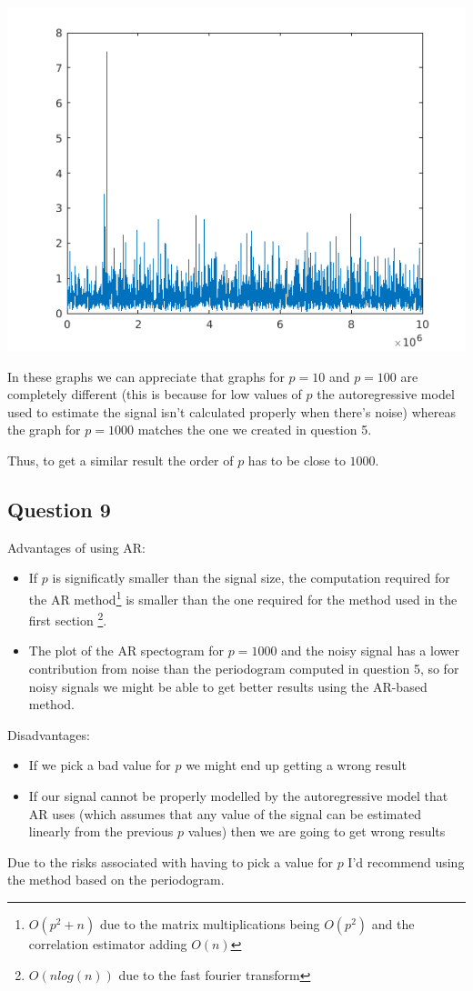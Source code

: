\documentclass[conference,9pt]{IEEEtran}
\begin{document}
\includegraphics[scale=0.6]{pn1000}

In these graphs we can appreciate that graphs for $p=10$ and $p=100$ are completely different (this is because for low values of $p$ the autoregressive model used to estimate the signal isn't calculated properly when there's noise) whereas the graph for $p=1000$ matches the one we created in question 5.

Thus, to get a similar result the order of $p$ has to be close to $1000$.

\subsection{Question 9}

Advantages of using AR:
\begin{itemize}
  \item If $p$ is significatly smaller than the signal size, the computation required for the AR method\footnote{$O(p^2+n)$ due to the matrix multiplications being $O(p^2)$ and the correlation estimator adding $O(n)$} is smaller than the one required for the method used in the first section \footnote{$O(nlog(n))$ due to the fast fourier transform}.
  \item The plot of the AR spectogram for $p=1000$ and the noisy signal has a lower contribution from noise than the periodogram computed in question 5, so for noisy signals we might be able to get better results using the AR-based method.
\end{itemize}

Disadvantages:
\begin{itemize}
  \item If we pick a bad value for $p$ we might end up getting a wrong result
  \item If our signal cannot be properly modelled by the autoregressive model that AR uses (which assumes that any value of the signal can be estimated linearly from the previous $p$ values) then we are going to get wrong results
\end{itemize}

Due to the risks associated with having to pick a value for $p$ I'd recommend using the method based on the periodogram.
\end{document}
